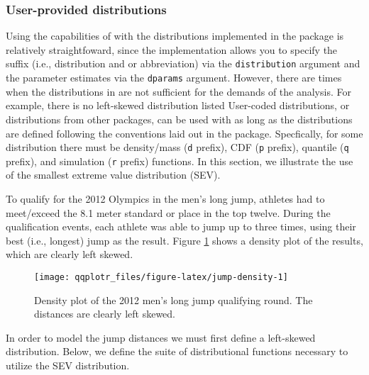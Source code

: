 \FloatBarrier

\subsubsection{User-provided
distributions}\label{user-provided-distributions}

\label{sec:user-dists}

Using the capabilities of  with the distributions
implemented in the  package is relatively straightfoward,
since the implementation allows you to specify the suffix (i.e.,
distribution and or abbreviation) via the \texttt{distribution} argument
and the parameter estimates via the \texttt{dparams} argument. However,
there are times when the distributions in  are not sufficient
for the demands of the analysis. For example, there is no left-skewed
distribution listed
User-coded distributions, or distributions from other packages, can be
used with  as long as the distributions are defined
following the conventions laid out in the  package.
Specfically, for some distribution there must be density/mass
(\texttt{d} prefix), CDF (\texttt{p} prefix), quantile (\texttt{q}
prefix), and simulation (\texttt{r} prefix) functions. In this section,
we illustrate the use of the smallest extreme value distribution (SEV).

To qualify for the 2012 Olympics in the men's long jump, athletes had to
meet/exceed the 8.1 meter standard or place in the top twelve. During
the qualification events, each athlete was able to jump up to three
times, using their best (i.e., longest) jump as the result. Figure
\ref{fig:jump-density} shows a density plot of the results, which are
clearly left skewed.

\begin{Schunk}
\begin{figure}

{\centering \texttt{[image: qqplotr\_files/figure-latex/jump-density-1]} 

}

\caption[Density plot of the 2012 men's long jump qualifying round]{Density plot of the 2012 men's long jump qualifying round. The distances are clearly left skewed.}\label{fig:jump-density}
\end{figure}
\end{Schunk}

In order to model the jump distances we must first define a left-skewed
distribution. Below, we define the suite of distributional functions
necessary to utilize the SEV distribution.

